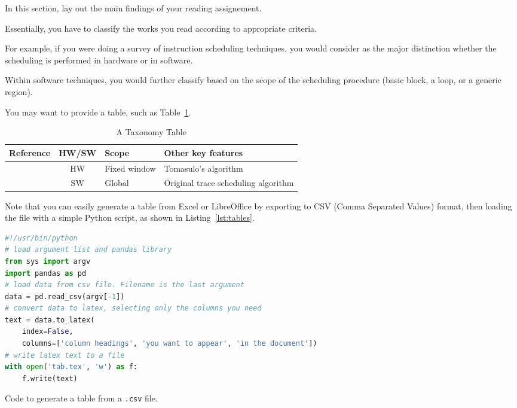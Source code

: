 In this section, lay out the main findings of your reading assignement.

Essentially, you have to classify the works you read according to appropriate criteria. 

For example, if you were doing a survey of instruction scheduling techniques, you would consider as the major distinction whether the scheduling is performed in hardware or in software. 

Within software techniques, you would further classify based on the scope of the scheduling procedure (basic block, a loop, or a generic region).

You may want to provide a table, such as Table~\ref{tab:taxon}.

\begin{table}
\centering
\caption{\label{tab:taxon}A Taxonomy Table}
\begin{tabular}{lclp{}}
\toprule
Reference & HW/SW & Scope & Other key features \\ %
\midrule
\cite{Thornton:1964:POC:1464039.1464045} & HW & Fixed window & Tomasulo's algorithm \\
\cite{Fisher:1981:TST:1311075.1311325} & SW & Global & Original trace scheduling algorithm\\
\bottomrule
\end{tabular}
\end{table}

Note that you can easily generate a \latex table from Excel or LibreOffice by exporting to CSV (Comma Separated Values) format, then loading the file with a simple Python script, as shown in Listing~\ref{lst:tables}.

\begin{listing}
\begin{lstlisting}[language=Python]
#!/usr/bin/python 
# load argument list and pandas library
from sys import argv
import pandas as pd
# load data from csv file. Filename is the last argument
data = pd.read_csv(argv[-1])
# convert data to latex, selecting only the columns you need
text = data.to_latex(
	index=False,
	columns=['column headings', 'you want to appear', 'in the document'])
# write latex text to a file
with open('tab.tex', 'w') as f:
	f.write(text)
\end{lstlisting}
\caption{\label{lst:tables}Code to generate a \latex table from a \texttt{.csv} file.}
\end{listing}

